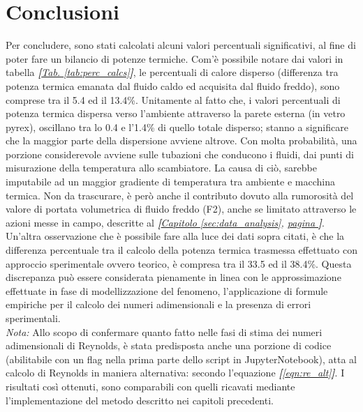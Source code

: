 \documentclass[a4paper,10pt]{article}                                                                                       %
\begin{document}
\section{Conclusioni}                                                                                                       %
\label{sec:conclusions}                                                                                                     %
  Per concludere, sono stati calcolati alcuni valori percentuali significativi, al fine di poter fare un bilancio di
  potenze termiche. Com'è possibile notare dai valori in tabella
  \textit{\textbf{[}\hyperref[tab:perc_calcs]{Tab. }\ref{tab:perc_calcs}\textbf{]}}, le percentuali di calore disperso
  (differenza tra potenza termica emanata dal fluido caldo ed acquisita dal fluido freddo), sono comprese tra il 5.4 ed il
  13.4\%. Unitamente al fatto che, i valori percentuali di potenza termica dispersa verso l'ambiente attraverso la parete
  esterna (in vetro pyrex), oscillano tra lo 0.4 e l'1.4\% di quello totale disperso; stanno a significare che la maggior
  parte della dispersione avviene altrove. Con molta probabilità, una porzione considerevole avviene sulle tubazioni che
  conducono i fluidi, dai punti di misurazione della temperatura allo scambiatore. La causa di ciò, sarebbe imputabile ad
  un maggior gradiente di temperatura tra ambiente e macchina termica. Non da trascurare, è però anche il contributo dovuto
  alla rumorosità del valore di portata volumetrica di fluido freddo (F2), anche se limitato attraverso le azioni messe in
  campo, descritte al \textit{\textbf{[}\hyperref[sec:data_analysis]{Capitolo }\ref{sec:data_analysis},
  \hyperref[sec:data_analysis]{pagina }\pageref{sec:data_analysis}\textbf{]}}. Un'altra osservazione che è possibile fare
  alla luce dei dati sopra citati, è che la differenza percentuale tra il calcolo della potenza termica trasmessa
  effettuato con approccio sperimentale ovvero teorico, è compresa tra il 33.5 ed il 38.4\%. Questa discrepanza può essere
  considerata pienamente in linea con le approssimazione effettuate in fase di modellizzazione del fenomeno, l'applicazione
  di formule empiriche per il calcolo dei numeri adimensionali e la presenza di errori sperimentali.\vspace{2mm}\\
  \textit{Nota:} Allo scopo di confermare quanto fatto nelle fasi di stima dei numeri adimensionali di Reynolds, è stata
  predisposta anche una porzione di codice (abilitabile con un flag nella prima parte dello script in JupyterNotebook),
  atta al calcolo di Reynolds in maniera alternativa: secondo l'equazione \textit{\textbf{[}\ref{eqn:re_alt}\textbf{]}}.
  I risultati così ottenuti, sono comparabili con quelli ricavati mediante l'implementazione del metodo descritto nei
  capitoli precedenti.
\clearpage                                                                                                                  %
\end{document}
